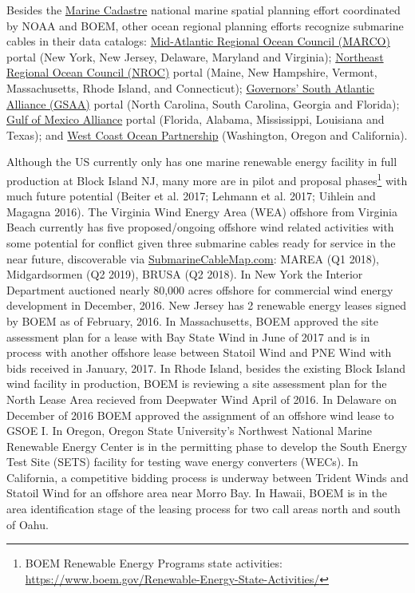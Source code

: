 \documentclass[]{article}
\let\rmarkdownfootnote\footnote%
\def\footnote{\protect\rmarkdownfootnote}
\begin{document}
Besides the \href{http://marinecadastre.gov}{Marine Cadastre} national
marine spatial planning effort coordinated by NOAA and BOEM, other ocean
regional planning efforts recognize submarine cables in their data
catalogs: \href{http://midatlanticocean.org}{Mid-Atlantic Regional Ocean
Council (MARCO)} portal (New York, New Jersey, Delaware, Maryland and
Virginia); \href{http://northeastoceancouncil.org/}{Northeast Regional
Ocean Council (NROC)} portal (Maine, New Hampshire, Vermont,
Massachusetts, Rhode Island, and Connecticut);
\href{http://southatlanticalliance.org/}{Governors' South Atlantic
Alliance (GSAA)} portal (North Carolina, South Carolina, Georgia and
Florida); \href{http://www.gulfofmexicoalliance.org/}{Gulf of Mexico
Alliance} portal (Florida, Alabama, Mississippi, Louisiana and Texas);
and \href{http://www.westcoastoceans.org/}{West Coast Ocean Partnership}
(Washington, Oregon and California).

Although the US currently only has one marine renewable energy facility
in full production at Block Island NJ, many more are in pilot and
proposal phases\footnote{BOEM Renewable Energy Programs state
  activities:
  \url{https://www.boem.gov/Renewable-Energy-State-Activities/}} with
much future potential (Beiter et al. 2017; Lehmann et al. 2017; Uihlein
and Magagna 2016). The Virginia Wind Energy Area (WEA) offshore from
Virginia Beach currently has five proposed/ongoing offshore wind related
activities with some potential for conflict given three submarine cables
ready for service in the near future, discoverable via
\href{http://submarinecablemap.com}{SubmarineCableMap.com}: MAREA (Q1
2018), Midgardsormen (Q2 2019), BRUSA (Q2 2018). In New York the
Interior Department auctioned nearly 80,000 acres offshore for
commercial wind energy development in December, 2016. New Jersey has 2
renewable energy leases signed by BOEM as of February, 2016. In
Massachusetts, BOEM approved the site assessment plan for a lease with
Bay State Wind in June of 2017 and is in process with another offshore
lease between Statoil Wind and PNE Wind with bids received in January,
2017. In Rhode Island, besides the existing Block Island wind facility
in production, BOEM is reviewing a site assessment plan for the North
Lease Area recieved from Deepwater Wind April of 2016. In Delaware on
December of 2016 BOEM approved the assignment of an offshore wind lease
to GSOE I. In Oregon, Oregon State University's Northwest National
Marine Renewable Energy Center is in the permitting phase to develop the
South Energy Test Site (SETS) facility for testing wave energy
converters (WECs). In California, a competitive bidding process is
underway between Trident Winds and Statoil Wind for an offshore area
near Morro Bay. In Hawaii, BOEM is in the area identification stage of
the leasing process for two call areas north and south of Oahu.
\end{document}
